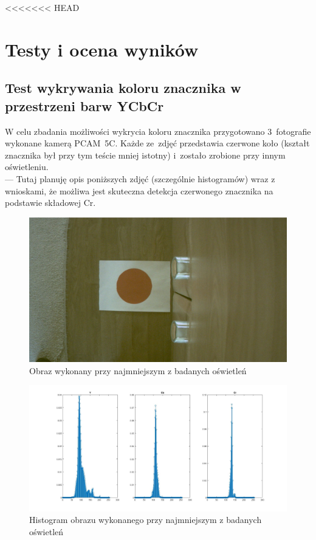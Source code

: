 <<<<<<< HEAD
\chapter{Testy i ocena wyników}
\label{cha:Testy i ocena wyników}
\section{Test wykrywania koloru znacznika w przestrzeni barw YCbCr} 
\label{sec:Test wykrywania koloru znacznika w przestrzeni barw YCbCr}
W celu zbadania możliwości wykrycia koloru znacznika przygotowano 3~fotografie wykonane kamerą PCAM~5C. Każde ze~zdjęć przedstawia czerwone koło (kształt znacznika był przy tym teście mniej istotny) i~zostało zrobione przy innym oświetleniu.\\
--- Tutaj planuję opis poniższych zdjęć (szczególnie histogramów) wraz z wnioskami, że możliwa jest skuteczna detekcja czerwonego znacznika na podstawie składowej Cr.
\begin{figure}[h]
	\centering
	\includegraphics[width=\textwidth]{osw1.jpg}
	\caption{Obraz wykonany przy najmniejszym z badanych oświetleń}
	\label{fig:osw1}
\end{figure}
\begin{figure}[h]
	\centering
	\includegraphics[width=\textwidth]{hist1.jpg}
	\caption{Histogram obrazu wykonanego przy najmniejszym z badanych oświetleń}
	\label{fig:hist1}
\end{figure}
